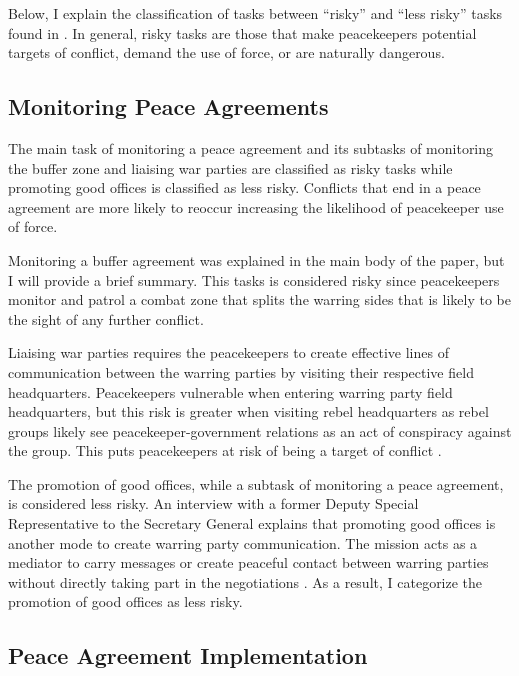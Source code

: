 Below, I explain the classification of tasks between ``risky'' and ``less risky'' tasks found in \cite{lloyd2021}. In general, risky tasks are those that make peacekeepers potential targets of conflict, demand the use of force, or are naturally dangerous. 

\vspace{1em}

\subsection*{Monitoring Peace Agreements}

The main task of monitoring a peace agreement and its subtasks of monitoring the buffer zone and liaising war parties are classified as risky tasks while promoting good offices is classified as less risky. Conflicts that end in a peace agreement are more likely to reoccur \citep{fortna2004,walter2009} increasing the likelihood of peacekeeper use of force.

Monitoring a buffer agreement was explained in the main body of the paper, but I will provide a brief summary. This tasks is considered risky since peacekeepers monitor and patrol a combat zone that splits the warring sides that is likely to be the sight of any further conflict. 

Liaising war parties requires the peacekeepers to create effective lines of communication between the warring parties by visiting their respective field headquarters. Peacekeepers vulnerable when entering warring party field headquarters, but this risk is greater when visiting rebel headquarters as rebel groups likely see peacekeeper-government relations as an act of conspiracy against the group. This puts peacekeepers at risk of being a target of conflict \citep{fjelde2016}.

The promotion of good offices, while a subtask of monitoring a peace agreement, is considered less risky. An interview with a former Deputy Special Representative to the Secretary General explains that promoting good offices is another mode to create warring party communication. The mission acts as a mediator to carry messages or create peaceful contact between warring parties without directly taking part in the negotiations \citep{della-giacoma_2015}. As a result, I categorize the promotion of good offices as less risky. 

\subsection*{Peace Agreement Implementation}

